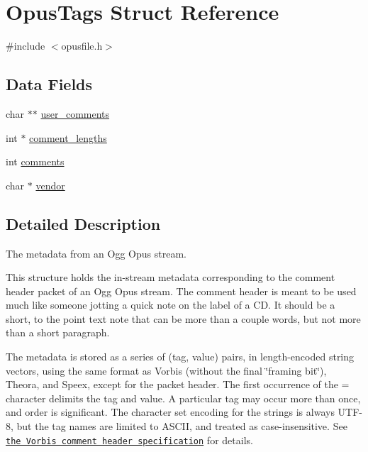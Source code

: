 \hypertarget{struct_opus_tags}{}\section{Opus\+Tags Struct Reference}
\label{struct_opus_tags}


{\ttfamily \#include $<$opusfile.\+h$>$}

\subsection*{Data Fields}
\begin{DoxyCompactItemize}
\item 
char $\ast$$\ast$ \hyperlink{struct_opus_tags_ad53d571bd8b23691089242e4e161358a}{user\+\_\+comments}
\item 
int $\ast$ \hyperlink{struct_opus_tags_aa99547abb03d7dbe0cd7095d8b706170}{comment\+\_\+lengths}
\item 
int \hyperlink{struct_opus_tags_a65c37166930a1f5d682fa6c863fc28c6}{comments}
\item 
char $\ast$ \hyperlink{struct_opus_tags_af6ff133dfd801934d981bc5905dae0bd}{vendor}
\end{DoxyCompactItemize}


\subsection{Detailed Description}
The metadata from an Ogg Opus stream.

This structure holds the in-\/stream metadata corresponding to the \textquotesingle{}comment\textquotesingle{} header packet of an Ogg Opus stream. The comment header is meant to be used much like someone jotting a quick note on the label of a CD. It should be a short, to the point text note that can be more than a couple words, but not more than a short paragraph.

The metadata is stored as a series of (tag, value) pairs, in length-\/encoded string vectors, using the same format as Vorbis (without the final \char`\"{}framing
 bit\char`\"{}), Theora, and Speex, except for the packet header. The first occurrence of the \textquotesingle{}=\textquotesingle{} character delimits the tag and value. A particular tag may occur more than once, and order is significant. The character set encoding for the strings is always U\+T\+F-\/8, but the tag names are limited to A\+S\+C\+II, and treated as case-\/insensitive. See \href{http://www.xiph.org/vorbis/doc/v-comment.html}{\tt the Vorbis comment header specification} for details.

